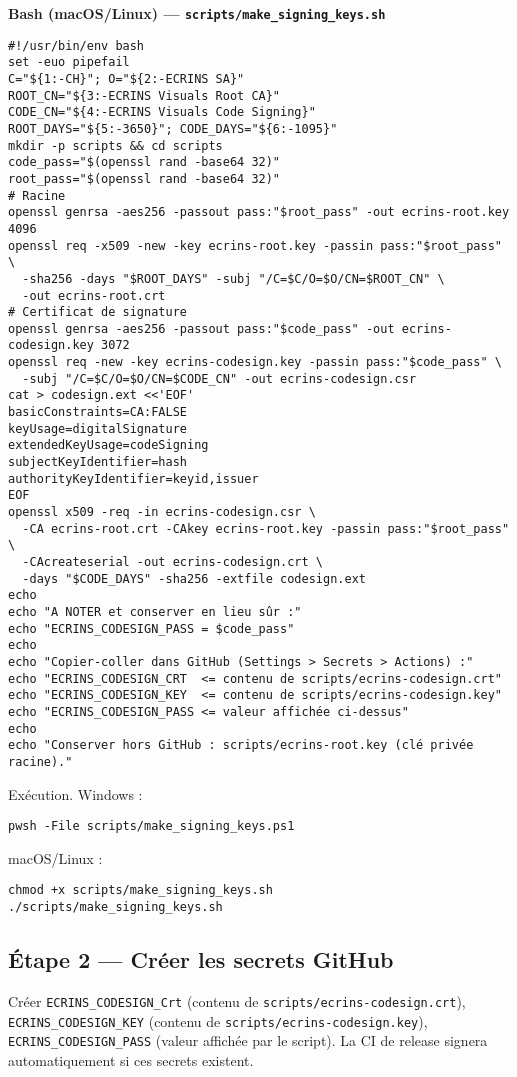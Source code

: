\textbf{Bash (macOS/Linux) — \texttt{scripts/make\_signing\_keys.sh}}
\begin{verbatim}
#!/usr/bin/env bash
set -euo pipefail
C="${1:-CH}"; O="${2:-ECRINS SA}"
ROOT_CN="${3:-ECRINS Visuals Root CA}"
CODE_CN="${4:-ECRINS Visuals Code Signing}"
ROOT_DAYS="${5:-3650}"; CODE_DAYS="${6:-1095}"
mkdir -p scripts && cd scripts
code_pass="$(openssl rand -base64 32)"
root_pass="$(openssl rand -base64 32)"
# Racine
openssl genrsa -aes256 -passout pass:"$root_pass" -out ecrins-root.key 4096
openssl req -x509 -new -key ecrins-root.key -passin pass:"$root_pass" \
  -sha256 -days "$ROOT_DAYS" -subj "/C=$C/O=$O/CN=$ROOT_CN" \
  -out ecrins-root.crt
# Certificat de signature
openssl genrsa -aes256 -passout pass:"$code_pass" -out ecrins-codesign.key 3072
openssl req -new -key ecrins-codesign.key -passin pass:"$code_pass" \
  -subj "/C=$C/O=$O/CN=$CODE_CN" -out ecrins-codesign.csr
cat > codesign.ext <<'EOF'
basicConstraints=CA:FALSE
keyUsage=digitalSignature
extendedKeyUsage=codeSigning
subjectKeyIdentifier=hash
authorityKeyIdentifier=keyid,issuer
EOF
openssl x509 -req -in ecrins-codesign.csr \
  -CA ecrins-root.crt -CAkey ecrins-root.key -passin pass:"$root_pass" \
  -CAcreateserial -out ecrins-codesign.crt \
  -days "$CODE_DAYS" -sha256 -extfile codesign.ext
echo
echo "A NOTER et conserver en lieu sûr :"
echo "ECRINS_CODESIGN_PASS = $code_pass"
echo
echo "Copier-coller dans GitHub (Settings > Secrets > Actions) :"
echo "ECRINS_CODESIGN_CRT  <= contenu de scripts/ecrins-codesign.crt"
echo "ECRINS_CODESIGN_KEY  <= contenu de scripts/ecrins-codesign.key"
echo "ECRINS_CODESIGN_PASS <= valeur affichée ci-dessus"
echo
echo "Conserver hors GitHub : scripts/ecrins-root.key (clé privée racine)."
\end{verbatim}

Exécution.
Windows :
\begin{verbatim}
pwsh -File scripts/make_signing_keys.ps1
\end{verbatim}
macOS/Linux :
\begin{verbatim}
chmod +x scripts/make_signing_keys.sh
./scripts/make_signing_keys.sh
\end{verbatim}

\subsection*{Étape 2 — Créer les secrets GitHub}
Créer \texttt{ECRINS\_CODESIGN\_Crt} (contenu de \texttt{scripts/ecrins-codesign.crt}), \texttt{ECRINS\_CODESIGN\_KEY} (contenu de \texttt{scripts/ecrins-codesign.key}), \texttt{ECRINS\_CODESIGN\_PASS} (valeur affichée par le script). La CI de release signera automatiquement si ces secrets existent.

